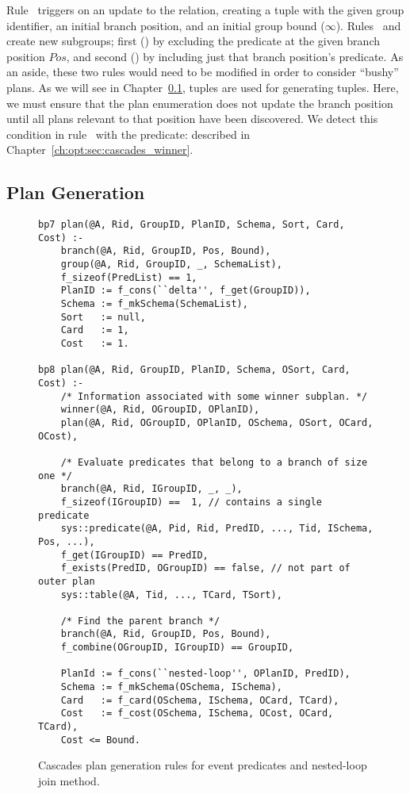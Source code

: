 Rule~ triggers on an update to the  relation, creating a
 tuple with the given group identifier, an initial branch position,
and an initial group bound ($\infty$).  Rules~ and  create new
subgroups; first () by excluding the predicate at the given branch
position $Pos$, and second () by including just that branch position's
predicate.  As an aside, these two rules would need to be modified in order to
consider ``bushy'' plans.  As we will see in
Chapter~\ref{ch:opt:sec:cascades_plan},  tuples are used for
generating  tuples.  Here, we must ensure that the plan enumeration
does not update the branch position until all plans relevant to that position
have been discovered.  We detect this condition in rule~ with the
 predicate: described in
Chapter~\ref{ch:opt:sec:cascades_winner}.

\subsection{Plan Generation}
\label{ch:opt:sec:cascades_plan}

\begin{figure*}
\ssp
\centering
\begin{lstlisting}
bp7 plan(@A, Rid, GroupID, PlanID, Schema, Sort, Card, Cost) :-
    branch(@A, Rid, GroupID, Pos, Bound),
    group(@A, Rid, GroupID, _, SchemaList),
    f_sizeof(PredList) == 1,
    PlanID := f_cons(``delta'', f_get(GroupID)),
    Schema := f_mkSchema(SchemaList),
    Sort   := null,
    Card   := 1,
    Cost   := 1.

bp8 plan(@A, Rid, GroupID, PlanID, Schema, OSort, Card, Cost) :-
    /* Information associated with some winner subplan. */
    winner(@A, Rid, OGroupID, OPlanID),
    plan(@A, Rid, OGroupID, OPlanID, OSchema, OSort, OCard, OCost),

    /* Evaluate predicates that belong to a branch of size one */
    branch(@A, Rid, IGroupID, _, _),
    f_sizeof(IGroupID) ==  1, // contains a single predicate
    sys::predicate(@A, Pid, Rid, PredID, ..., Tid, ISchema, Pos, ...),
    f_get(IGroupID) == PredID, 
    f_exists(PredID, OGroupID) == false, // not part of outer plan
    sys::table(@A, Tid, ..., TCard, TSort),

    /* Find the parent branch */
    branch(@A, Rid, GroupID, Pos, Bound),
    f_combine(OGroupID, IGroupID) == GroupID,

    PlanId := f_cons(``nested-loop'', OPlanID, PredID),
    Schema := f_mkSchema(OSchema, ISchema),
    Card   := f_card(OSchema, ISchema, OCard, TCard),
    Cost   := f_cost(OSchema, ISchema, OCost, OCard, TCard),
    Cost <= Bound.
\end{lstlisting}
\caption{\label{ch:opt:fig:cascades_plan1} Cascades plan generation rules for event
predicates and nested-loop join method.}
\end{figure*}

